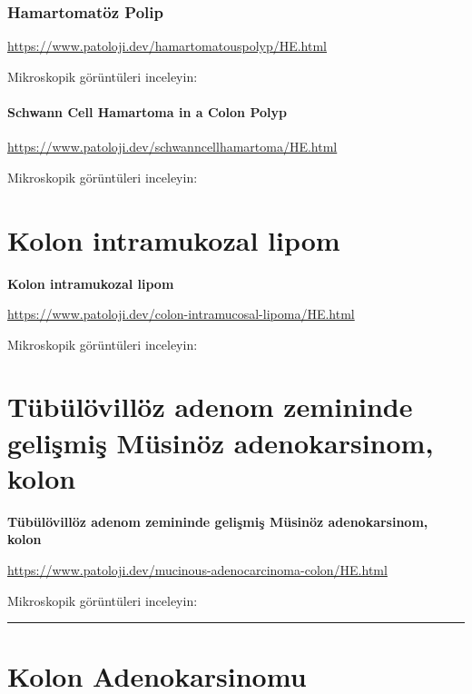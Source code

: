 \documentclass[
  letterpaper,
  DIV=11,
  numbers=noendperiod]{scrreprt}
\begin{document}
\hypertarget{hamartomatuxf6z-polip-1}{%
\subsection{Hamartomatöz Polip}\label{hamartomatuxf6z-polip-1}}

\url{https://www.patoloji.dev/hamartomatouspolyp/HE.html}

Mikroskopik görüntüleri inceleyin:

\hypertarget{schwann-cell-hamartoma-in-a-colon-polyp-1}{%
\subsubsection{Schwann Cell Hamartoma in a Colon
Polyp}\label{schwann-cell-hamartoma-in-a-colon-polyp-1}}

\url{https://www.patoloji.dev/schwanncellhamartoma/HE.html}

Mikroskopik görüntüleri inceleyin:

\hypertarget{kolon-intramukozal-lipom}{%
\chapter{Kolon intramukozal lipom}\label{kolon-intramukozal-lipom}}

\textbf{Kolon intramukozal lipom}

\url{https://www.patoloji.dev/colon-intramucosal-lipoma/HE.html}

Mikroskopik görüntüleri inceleyin:

\hypertarget{tuxfcbuxfcluxf6villuxf6z-adenom-zemininde-geliux15fmiux15f-muxfcsinuxf6z-adenokarsinom-kolon}{%
\chapter{Tübülövillöz adenom zemininde gelişmiş Müsinöz adenokarsinom,
kolon}\label{tuxfcbuxfcluxf6villuxf6z-adenom-zemininde-geliux15fmiux15f-muxfcsinuxf6z-adenokarsinom-kolon}}

\textbf{Tübülövillöz adenom zemininde gelişmiş Müsinöz adenokarsinom,
kolon}

\url{https://www.patoloji.dev/mucinous-adenocarcinoma-colon/HE.html}

Mikroskopik görüntüleri inceleyin:

\begin{center}\rule{0.5\linewidth}{0.5pt}\end{center}

\hypertarget{kolon-adenokarsinomu}{%
\chapter{Kolon Adenokarsinomu}\label{kolon-adenokarsinomu}}
\end{document}
